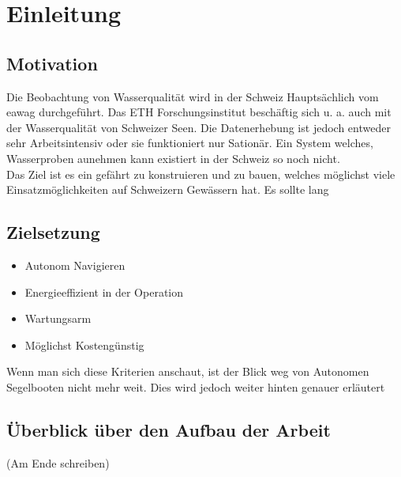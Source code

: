 
\chapter{Einleitung }
\label{chap:einleitung}

\section{Motivation}
Die Beobachtung von Wasserqualität wird in der Schweiz Hauptsächlich vom eawag durchgeführt. Das ETH Forschungsinstitut beschäftig sich u. a. auch mit der Wasserqualität von Schweizer Seen. Die Datenerhebung ist jedoch entweder sehr Arbeitsintensiv oder sie funktioniert nur Sationär. Ein System welches, Wasserproben aunehmen kann existiert in der Schweiz so noch nicht.
\\
Das Ziel ist es ein gefährt zu konstruieren und zu bauen, welches möglichst viele Einsatzmöglichkeiten auf Schweizern Gewässern hat. Es sollte lang 

\section{Zielsetzung}



\begin{itemize}
    \item Autonom Navigieren
    \item Energieeffizient in der Operation
    \item Wartungsarm
    \item Möglichst Kostengünstig
\end{itemize}

Wenn man sich diese Kriterien anschaut, ist der Blick weg von Autonomen Segelbooten nicht mehr weit. Dies wird jedoch weiter hinten genauer erläutert

\section{Überblick über den Aufbau der Arbeit}
(Am Ende schreiben)